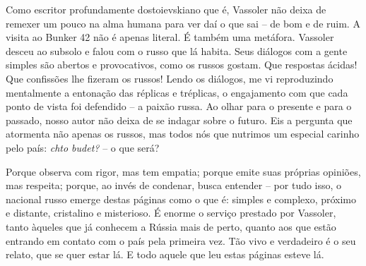 Como escritor profundamente dostoievskiano que é, Vassoler não deixa de
remexer um pouco na alma humana para ver daí o que sai -- de bom e de
ruim. A visita ao Bunker 42 não é apenas literal. É também uma metáfora.
Vassoler desceu ao subsolo e falou com o russo que lá habita. Seus
diálogos com a gente simples são abertos e provocativos, como os russos
gostam. Que respostas ácidas! Que confissões lhe fizeram os russos!
Lendo os diálogos, me vi reproduzindo mentalmente a entonação das
réplicas e tréplicas, o engajamento com que cada ponto de vista foi
defendido -- a paixão russa. Ao olhar para o presente e para o passado,
nosso autor não deixa de se indagar sobre o futuro. Eis a pergunta que
atormenta não apenas os russos, mas todos nós que nutrimos um especial
carinho pelo país: \emph{chto budet?} -- o que será?

Porque observa com rigor, mas tem empatia; porque emite suas próprias
opiniões, mas respeita; porque, ao invés de condenar, busca entender --
por tudo isso, o nacional russo emerge destas páginas como o que é:
simples e complexo, próximo e distante, cristalino e misterioso. É
enorme o serviço prestado por Vassoler, tanto àqueles que já conhecem a
Rússia mais de perto, quanto aos que estão entrando em contato com o
país pela primeira vez. Tão vivo e verdadeiro é o seu relato, que se
quer estar lá. E todo aquele que leu estas páginas esteve lá.


